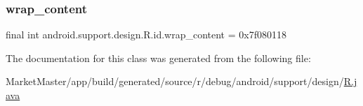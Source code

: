 \subsubsection{\texorpdfstring{wrap\+\_\+content}{wrap\_content}}
{\footnotesize\ttfamily final int android.\+support.\+design.\+R.\+id.\+wrap\+\_\+content = 0x7f080118\hspace{0.3cm}{\ttfamily [static]}}



The documentation for this class was generated from the following file\+:\begin{DoxyCompactItemize}
\item 
Market\+Master/app/build/generated/source/r/debug/android/support/design/\mbox{\hyperlink{debug_2android_2support_2design_2R_8java}{R.\+java}}\end{DoxyCompactItemize}
